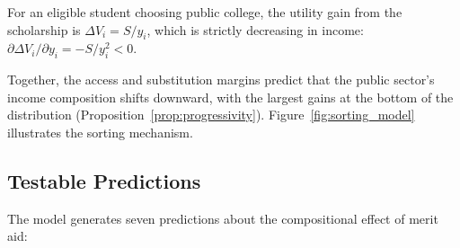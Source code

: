\begin{proposition}
\label{prop:progressivity}
For an eligible student choosing public college, the utility gain from
the scholarship is $\Delta V_i = S / y_i$, which is strictly
decreasing in income: $\partial \Delta V_i / \partial y_i = -S/y_i^2 < 0$.
\end{proposition}

Together, the access and substitution margins predict that the public
sector's income composition shifts downward, with the largest gains at
the bottom of the distribution
(Proposition~\ref{prop:progressivity}).
Figure~\ref{fig:sorting_model} illustrates the sorting mechanism.



\subsection{Testable Predictions}

The model generates seven predictions about the compositional effect
of merit aid:

